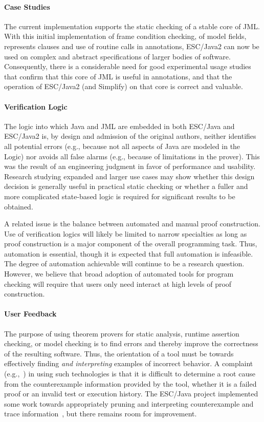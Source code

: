 \documentclass{llncs}
\begin{document}
\paragraph*{Case Studies} The current implementation supports the
static checking of a stable core of JML.  With this initial
implementation of frame condition checking, of model fields,
represents clauses and use of routine calls in annotations, ESC/Java2
can now be used on complex and abstract specifications of larger
bodies of software.  Consequently, there is a considerable need for
good experimental usage studies that confirm that this core of JML is
useful in annotations, and that the operation of ESC/Java2 (and
Simplify) on that core is correct and valuable.

\paragraph*{Verification Logic} The logic into which Java and JML are
embedded in both ESC/Java and ESC/Java2 is, by design and admission of
the original authors, neither identifies all potential errors (e.g., because not
all aspects of Java are modeled in the Logic) nor avoids all false alarms (e.g., 
because of limitations in the prover).  This was the
result of an engineering judgment in favor of performance and
usability.  Research studying expanded and larger use cases may show
whether this design decision is generally useful in practical static
checking or whether a fuller and more complicated state-based logic is
required for significant results to be obtained.

A related issue is the balance between automated and manual proof
construction.  Use of verification logics will likely be limited to
narrow specialties as long as proof construction is a major component
of the overall programming task.  Thus, automation is essential,
though it is expected that full automation is infeasible.  The degree
of automation achievable will continue to be a research question.
However, we believe that broad adoption of automated tools for program
checking will require that users only need interact at high levels of
proof construction.

\paragraph*{User Feedback} The purpose of using theorem provers for
static analysis, runtime assertion checking, or model checking is to
find errors and thereby improve the correctness of the resulting
software.  Thus, the orientation of a tool must be towards effectively
finding \emph{and interpreting} examples of incorrect behavior.  A
complaint (e.g.,~\cite{GroceVisser03}) in using such technologies is
that it is difficult to determine a root cause from the counterexample
information provided by the tool, whether it is a failed proof or an
invalid test or execution history.  The ESC/Java project implemented
some work towards appropriately pruning and interpreting
counterexample and trace information~\cite{PruningPaper}, but there
remains room for improvement.
\end{document}

